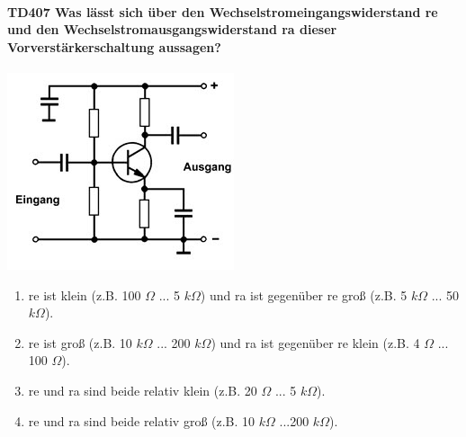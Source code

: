 \documentclass[8pt]{article}
\begin{document}
\begin{enumerate}
\begin{enumerate}[nolistsep,label=\Alph*]
\paragraph*{TD407 Was lässt sich über den Wechselstromeingangswiderstand re und den Wechselstromausgangswiderstand ra dieser Vorverstärkerschaltung aussagen?}
\begin{center}
	\begin{minipage}{\linewidth}
		\centering
		\includegraphics[scale=1.0]{pics/td407_a.jpg}
	\end{minipage}
\end{center}
\begin{enumerate}[nolistsep,label=\Alph*]
\item re ist klein (z.B. 100 $\Omega$ ... 5 $k\Omega$) und ra ist gegenüber re groß (z.B. 5 $k\Omega$ ... 50 $k\Omega$).
\item re ist groß (z.B. 10 $k\Omega$ ... 200 $k\Omega$) und ra ist gegenüber re klein (z.B. 4 $\Omega$ ... 100 $\Omega$).
\item re und ra sind beide relativ klein (z.B. 20 $\Omega$ ... 5 $k\Omega$).
\item re und ra sind beide relativ groß (z.B. 10 $k\Omega$ ...200 $k\Omega$).
\end{enumerate}


\end{enumerate}
\end{enumerate}
\end{document}
